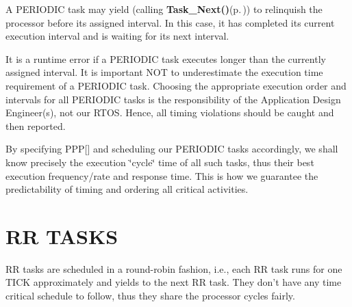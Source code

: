 A PERIODIC task may yield (calling {\bf Task\_\-Next()}{\rm (p.\,\pageref{os_8c_5a9b72d0dadaea32fec8d4ff1c0eafa4})}) to relinquish the processor before its assigned interval. In this case, it has completed its current execution interval and is waiting for its next interval.

It is a runtime error if a PERIODIC task executes longer than the currently assigned interval. It is important NOT to underestimate the execution time requirement of a PERIODIC task. Choosing the appropriate execution order and intervals for all PERIODIC tasks is the responsibility of the Application Design Engineer(s), not our RTOS. Hence, all timing violations should be caught and then reported.

By specifying PPP[] and scheduling our PERIODIC tasks accordingly, we shall know precisely the execution \char`\"{}cycle\char`\"{} time of all such tasks, thus their best execution frequency/rate and response time. This is how we guarantee the predictability of timing and ordering all critical activities.\section{RR TASKS}\label{index_rr}
RR tasks are scheduled in a round-robin fashion, i.e., each RR task runs for one TICK approximately and yields to the next RR task. They don't have any time critical schedule to follow, thus they share the processor cycles fairly.


